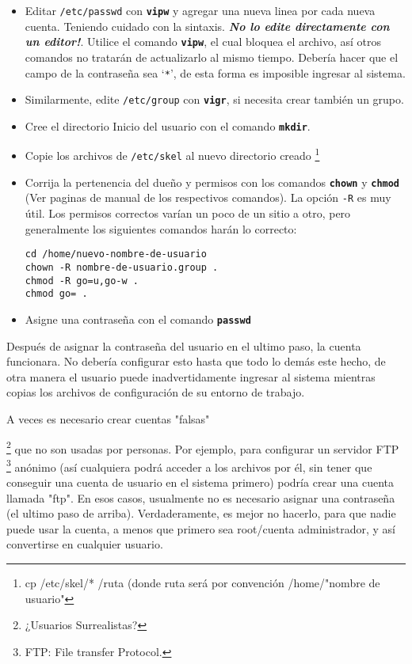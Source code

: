\begin{itemize}
	
	\item{ Editar \texttt{/etc/passwd} con
	\texttt{\textbf{vipw}} y agregar una nueva linea por cada nueva cuenta.
	Teniendo cuidado con la sintaxis.  \textit{\bf No lo edite directamente
	con un editor!}. Utilice el comando \texttt{\textbf{vipw}}, el cual bloquea el
	archivo, así otros comandos no tratarán de actualizarlo al mismo tiempo.
	Debería hacer que el campo de la contraseña sea `\texttt{*}',
	de esta forma es imposible ingresar al sistema.}

	\item{ Similarmente, edite \texttt{/etc/group} con
	\texttt{\textbf{vigr}}, si necesita crear también un
	grupo.} \item{ Cree el directorio Inicio del
	usuario con el comando \texttt{\textbf{mkdir}}.}
	\item{ Copie los archivos de \texttt{/etc/skel} al
	nuevo directorio creado 
	\footnote{cp /etc/skel/* /ruta
(donde ruta será por convención /home/"nombre de usuario"}}
	\item{ Corrija
	la pertenencia del dueño y permisos con los comandos
	\texttt{\textbf{chown}} y \texttt{\textbf{chmod}} (Ver paginas de
	manual de los respectivos comandos). La opción \texttt{-R} es
	muy útil. Los permisos correctos varían un poco de un sitio a otro, pero
	generalmente los siguientes comandos harán lo correcto:


\begin{verbatim}
cd /home/nuevo-nombre-de-usuario
chown -R nombre-de-usuario.group .  
chmod -R go=u,go-w .  
chmod go= .
\end{verbatim}


	}
	
	\item{ Asigne una contraseña con el comando
	\texttt{\textbf{passwd}}}

\end{itemize} 
	
	Después de asignar la contraseña del usuario en el ultimo paso, la
	cuenta funcionara. No debería configurar esto hasta que todo lo demás
	este hecho, de otra manera el usuario puede inadvertidamente ingresar al
	sistema mientras copias los archivos de configuración de su entorno de
	trabajo.

A veces es necesario crear cuentas "falsas"
		
		\footnote{¿Usuarios Surrealistas?} que no son
		usadas por personas. Por ejemplo, para configurar un servidor
		FTP
		\footnote{FTP: File
		transfer Protocol.} anónimo (así cualquiera podrá acceder a los archivos por
		él, sin tener que conseguir una cuenta de usuario en el sistema
		primero) podría crear una cuenta llamada "ftp". En esos casos,
		usualmente no es necesario asignar una contraseña (el ultimo
		paso de arriba).  Verdaderamente, es mejor no hacerlo, para que
		nadie puede usar la cuenta, a menos que primero sea root/cuenta
		administrador, y así convertirse en cualquier usuario.







